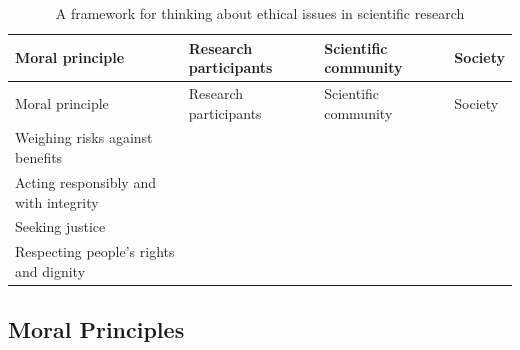 \documentclass[
]{krantz}
\begin{document}
\begin{longtable}[]{@{}
  >{\raggedright\arraybackslash}p{}
  >{\raggedright\arraybackslash}p{}
  >{\raggedright\arraybackslash}p{}
  >{\raggedright\arraybackslash}p{}@{}}
\caption{\label{tab:ethics}A framework for thinking about ethical issues in scientific research}\tabularnewline
\toprule\noalign{}
\begin{minipage}[b]{\linewidth}\raggedright
Moral principle
\end{minipage} & \begin{minipage}[b]{\linewidth}\raggedright
Research participants
\end{minipage} & \begin{minipage}[b]{\linewidth}\raggedright
Scientific community
\end{minipage} & \begin{minipage}[b]{\linewidth}\raggedright
Society
\end{minipage} \\
\midrule\noalign{}
\endfirsthead
\toprule\noalign{}
\begin{minipage}[b]{\linewidth}\raggedright
Moral principle
\end{minipage} & \begin{minipage}[b]{\linewidth}\raggedright
Research participants
\end{minipage} & \begin{minipage}[b]{\linewidth}\raggedright
Scientific community
\end{minipage} & \begin{minipage}[b]{\linewidth}\raggedright
Society
\end{minipage} \\
\midrule\noalign{}
\endhead
\bottomrule\noalign{}
\endlastfoot
Weighing risks against benefits & & & \\
Acting responsibly and with integrity & & & \\
Seeking justice & & & \\
Respecting people's rights and dignity & & & \\
\end{longtable}

\subsection*{Moral Principles}\label{moral-principles}
\end{document}

